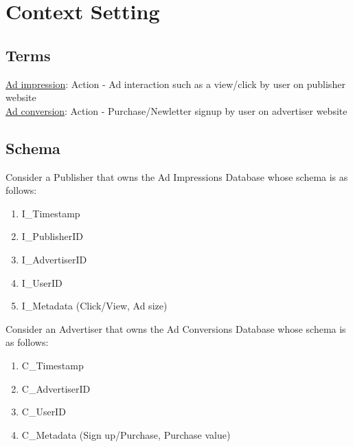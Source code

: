 
\clearpage
{}

%
\setcounter{section}{0} %

\section{Context Setting}
\subsection{Terms}
\underline{Ad impression}: Action - Ad interaction such as a view/click by user on publisher website \\

\underline{Ad conversion}: Action - Purchase/Newletter signup by user on advertiser website \\

\subsection{Schema}
Consider a Publisher that owns the Ad Impressions Database whose schema is as follows:
\begin{enumerate}
    \item I\_Timestamp
    \item I\_PublisherID
    \item I\_AdvertiserID
    \item I\_UserID
    \item I\_Metadata (Click/View, Ad size)
\end{enumerate}

Consider an Advertiser that owns the Ad Conversions Database whose schema is as follows:
\begin{enumerate}
    \item C\_Timestamp
    \item C\_AdvertiserID
    \item C\_UserID
    \item C\_Metadata (Sign up/Purchase, Purchase value)
\end{enumerate}

